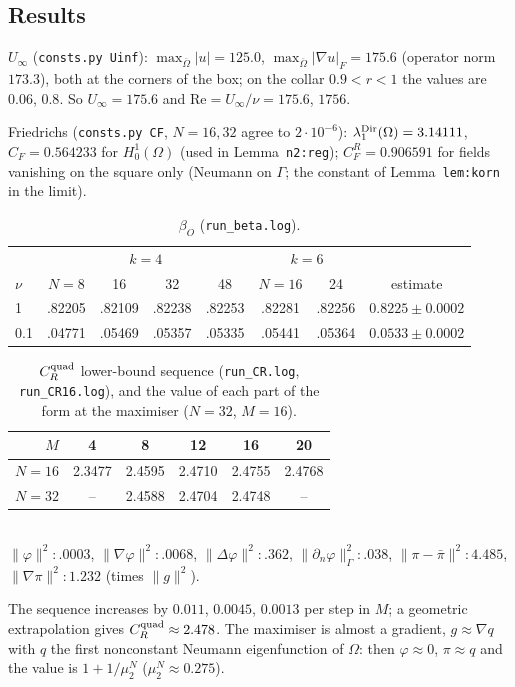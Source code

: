\documentclass[11pt]{article}
\theoremstyle{definition}
\theoremstyle{remark}
\newcommand{\norm}[1]{\|#1\|}
\newcommand{\dn}{\partial_n}
\renewcommand{\Re}{\mathrm{Re}}
\begin{document}
\subsection{Results}
$U_\infty$ (\texttt{consts.py Uinf}): $\max_{\overline\Omega}|u|=125.0$, $\max_{\overline\Omega}|\nabla u|_F=175.6$ (operator norm $173.3$), both at the corners of the box; on the collar $0.9<r<1$ the values are $0.06$, $0.8$. So $U_\infty=175.6$ and $\Re=U_\infty/\nu=175.6$, $1756$.

Friedrichs (\texttt{consts.py CF}, $N=16,32$ agree to $2\cdot10^{-6}$): $\lambda_1^{\rm Dir}(\Omega)=3.14111$, $C_F=0.564233$ for $H^1_0(\Omega)$ (used in Lemma~\texttt{n2:reg}); $C_F^R=0.906591$ for fields vanishing on the square only (Neumann on $\Gamma$; the constant of Lemma~\texttt{lem:korn} in the limit).

\begin{table}[h]\centering\small
\caption{$\beta_O$ (\texttt{run\_beta.log}).}\label{tab:beta}
\begin{tabular}{l|cccc|cc|c}
\toprule
 & \multicolumn{4}{c|}{$k=4$} & \multicolumn{2}{c|}{$k=6$} & \\
$\nu$ & $N=8$ & 16 & 32 & 48 & $N=16$ & 24 & estimate\\
\midrule
1 & .82205 & .82109 & .82238 & .82253 & .82281 & .82256 & $0.8225\pm0.0002$\\
0.1 & .04771 & .05469 & .05357 & .05335 & .05441 & .05364 & $0.0533\pm0.0002$\\
\bottomrule
\end{tabular}
\end{table}

\begin{table}[h]\centering\small
\caption{$C_R^{\rm quad}$ lower-bound sequence (\texttt{run\_CR.log}, \texttt{run\_CR16.log}), and the value of each part of the form at the maximiser ($N=32$, $M=16$).}\label{tab:CR}
\begin{tabular}{r|ccccc}
\toprule
$M$ & 4 & 8 & 12 & 16 & 20\\
\midrule
$N=16$ & 2.3477 & 2.4595 & 2.4710 & 2.4755 & 2.4768\\
$N=32$ & -- & 2.4588 & 2.4704 & 2.4748 & --\\
\bottomrule
\end{tabular}\\[3pt]
$\norm\varphi^2:.0003$, $\norm{\nabla\varphi}^2:.0068$, $\norm{\Delta\varphi}^2:.362$, $\norm{\dn\varphi}^2_\Gamma:.038$, $\norm{\pi-\bar\pi}^2:4.485$, $\norm{\nabla\pi}^2:1.232$ (times $\norm g^2$).
\end{table}
The sequence increases by $0.011$, $0.0045$, $0.0013$ per step in $M$; a geometric extrapolation gives $C_R^{\rm quad}\approx2.478$. The maximiser is almost a gradient, $g\approx\nabla q$ with $q$ the first nonconstant Neumann eigenfunction of $\Omega$: then $\varphi\approx0$, $\pi\approx q$ and the value is $1+1/\mu_2^N$ ($\mu_2^N\approx0.275$).
\end{document}
